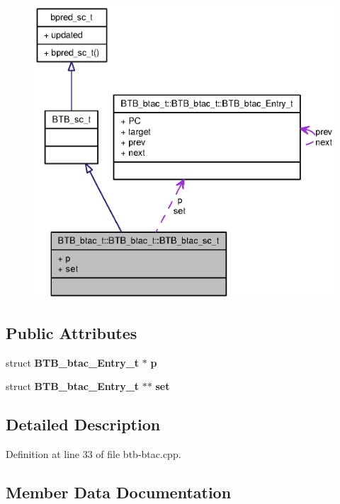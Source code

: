 \begin{figure}[H]
\begin{center}
\leavevmode
\includegraphics[width=380pt]{classBTB__btac__t_1_1BTB__btac__sc__t__coll__graph}
\end{center}
\end{figure}
\subsection*{Public Attributes}
\begin{CompactItemize}
\item 
struct {\bf BTB\_\-btac\_\-Entry\_\-t} $\ast$ {\bf p}
\item 
struct {\bf BTB\_\-btac\_\-Entry\_\-t} $\ast$$\ast$ {\bf set}
\end{CompactItemize}


\subsection{Detailed Description}


Definition at line 33 of file btb-btac.cpp.

\subsection{Member Data Documentation}
